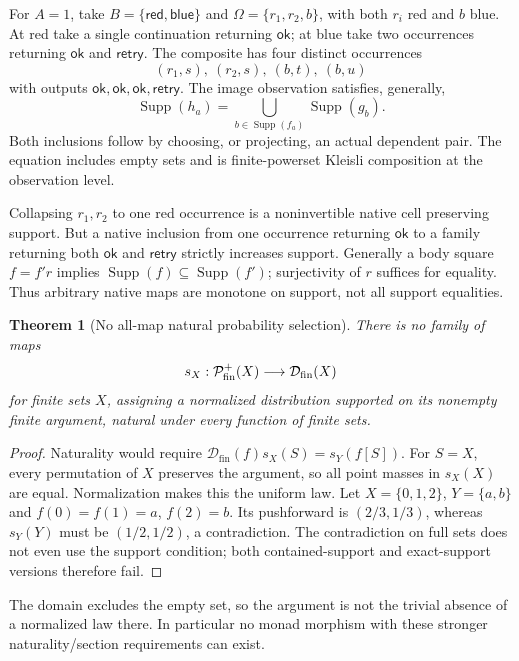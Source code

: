 \documentclass[11pt,a4paper]{article}
\newtheorem{theorem}{Theorem}[section]
\theoremstyle{definition}
\newcommand{\Dfin}{\mathcal D_{\mathrm{fin}}}
\begin{document}
For $A=1$, take $B=\{\mathsf{red},\mathsf{blue}\}$ and
$\Omega=\{r_1,r_2,b\}$, with both $r_i$ red and $b$ blue.
At red take a single continuation returning $\mathsf{ok}$; at blue
take two occurrences returning $\mathsf{ok}$ and $\mathsf{retry}$.
The composite has four distinct occurrences
\[
(r_1,s),\ (r_2,s),\ (b,t),\ (b,u)
\]
with outputs $\mathsf{ok},\mathsf{ok},\mathsf{ok},\mathsf{retry}$.
The image observation satisfies, generally,
\begin{equation}\label{eq:H-support}
\operatorname{Supp}(h_a)=
\bigcup_{b\in\operatorname{Supp}(f_a)}\operatorname{Supp}(g_b).
\end{equation}
Both inclusions follow by choosing, or projecting, an actual dependent
pair. The equation includes empty sets and is finite-powerset Kleisli
composition at the observation level.

Collapsing $r_1,r_2$ to one red occurrence is a noninvertible native
cell preserving support. But a native inclusion from one occurrence
returning $\mathsf{ok}$ to a family returning both $\mathsf{ok}$ and
$\mathsf{retry}$ strictly increases support. Generally a body square
$f=f'r$ implies $\operatorname{Supp}(f)\subseteq\operatorname{Supp}(f')$;
surjectivity of $r$ suffices for equality. Thus arbitrary native maps
are monotone on support, not all support equalities.

\begin{theorem}[No all-map natural probability selection]
There is no family of maps
\[
s_X:\mathcal P_{\rm fin}^{+}(X)\longrightarrow\Dfin(X)
\]
for finite sets $X$, assigning a normalized distribution supported on
its nonempty finite argument, natural under every function of finite sets.
\end{theorem}
\begin{proof}
Naturality would require
$\Dfin(f)s_X(S)=s_Y(f[S])$. For $S=X$, every permutation of $X$
preserves the argument, so all point masses in $s_X(X)$ are equal.
Normalization makes this the uniform law. Let $X=\{0,1,2\}$,
$Y=\{a,b\}$ and $f(0)=f(1)=a$, $f(2)=b$. Its pushforward is
$(2/3,1/3)$, whereas $s_Y(Y)$ must be $(1/2,1/2)$, a contradiction.
The contradiction on full sets does not even use the support condition;
both contained-support and exact-support versions therefore fail.
\end{proof}
The domain excludes the empty set, so the argument is not the trivial
absence of a normalized law there. In particular no monad morphism
with these stronger naturality/section requirements can exist.
\end{document}
